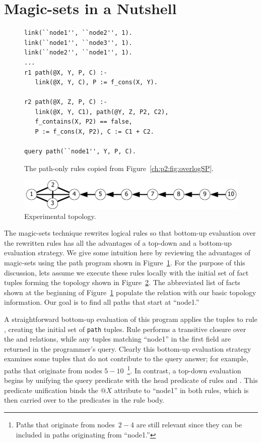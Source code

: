 \section{Magic-sets in a Nutshell}
\label{ch:magic:sec:review}

\begin{figure}
\ssp
\centering
\begin{lstlisting}
link(``node1'', ``node2'', 1).
link(``node1'', ``node3'', 1).
link(``node2'', ``node1'', 1).
...
r1 path(@X, Y, P, C) :-
   link(@X, Y, C), P := f_cons(X, Y).

r2 path(@X, Z, P, C) :-
   link(@X, Y, C1), path(@Y, Z, P2, C2),
   f_contains(X, P2) == false,
   P := f_cons(X, P2), C := C1 + C2.

query path(``node1'', Y, P, C).
\end{lstlisting}
\caption{\label{ch:magic:fig:basicSP}The path-only rules copied from Figure~\ref{ch:p2:fig:overlogSP}.}
\end{figure}

\begin{figure}
\centering
\includegraphics[scale=1.2]{figures/Topology}
\caption{Experimental topology.}
\label{ch:magic:fig:topo}
\end{figure}

The magic-sets technique rewrites logical rules so that bottom-up evaluation
over the rewritten rules has all the advantages of a top-down and a bottom-up
evaluation strategy.  We give some intuition here by reviewing the advantages
of magic-sets using the path program shown in
Figure~\ref{ch:magic:fig:basicSP}.  For the purpose of this discussion, lets
assume we execute these rules locally with the initial set of  fact
tuples forming the topology shown in Figure~\ref{ch:magic:fig:topo}.  The
abbreviated list of facts shown at the beginning of
Figure~\ref{ch:magic:fig:basicSP} populate the  relation with our
basic topology information.  Our goal is to find all paths that start at
``node1.''

A straightforward bottom-up evaluation of this program applies the 
tuples to rule , creating the initial set of {\tt path} tuples.  Rule
 performs a transitive closure over the  and 
relations, while any  tuples matching ``node1'' in the first field are
returned in the programmer's query.  Clearly this bottom-up evaluation strategy
examines some  tuples that do not contribute to the query answer; for
example, paths that originate from nodes $5-10$~\footnote{Paths that originate
from nodes~$2-4$ are still relevant since they can be included in paths
originating from ``node1.''}.  In contrast, a top-down evaluation begins by
unifying the query predicate with the head predicate of rules  and
.  This  predicate unification binds the $@X$ attribute to
``node1'' in both rules, which is then carried over to the predicates in the
rule body.

